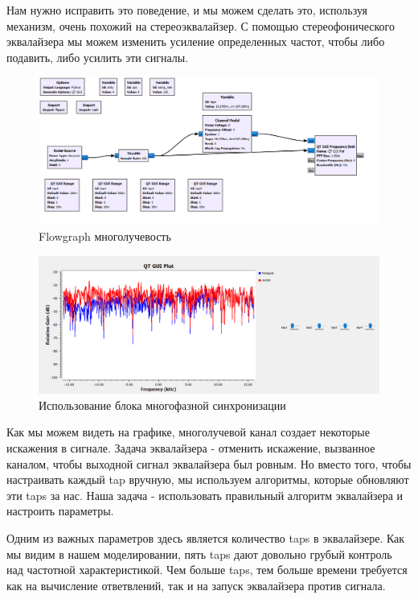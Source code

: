 \documentclass[a4paper, 14pt]{extarticle}
\begin{document}
    Нам нужно исправить это поведение, и мы можем сделать это, используя механизм, очень похожий на стереоэквалайзер.
    С помощью стереофонического эквалайзера мы можем изменить усиление определенных частот, чтобы либо подавить, либо усилить эти сигналы.

    \begin{figure}[H]
        \centering
        \includegraphics[width=0.8\linewidth]{flowgraph_multipath_sim}
        \caption{Flowgraph многолучевость}
        \label{fig:flowgraph_multipath_sim}
    \end{figure}

    \begin{figure}[H]
        \centering
        \includegraphics[width=0.8\linewidth]{multipath_sim}
        \caption{Использование блока многофазной синхронизации}
        \label{fig:multipath_sim}
    \end{figure}

    Как мы можем видеть на графике, многолучевой канал создает некоторые искажения в сигнале.
    Задача эквалайзера - отменить искажение, вызванное каналом, чтобы выходной сигнал эквалайзера был ровным.
    Но вместо того, чтобы настраивать каждый tap вручную, мы используем алгоритмы, которые обновляют эти taps за нас.
    Наша задача - использовать правильный алгоритм эквалайзера и настроить параметры.

    Одним из важных параметров здесь является количество taps в эквалайзере.
    Как мы видим в нашем моделировании, пять taps дают довольно грубый контроль над частотной характеристикой.
    Чем больше taps, тем больше времени требуется как на вычисление ответвлений, так и на запуск эквалайзера против сигнала.
\end{document}
